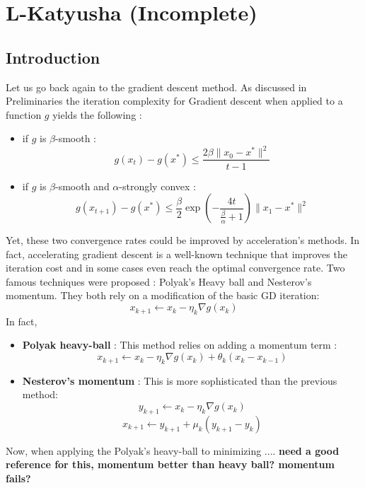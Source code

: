\documentclass[12pt]{report}
\begin{document}
\chapter{L-Katyusha  (Incomplete)}
\section{Introduction}
Let us go back again to the gradient descent method. As discussed in Preliminaries the iteration complexity for Gradient descent when applied to a function $g$ yields the following :
\begin{itemize}
    \item if $g$ is $\beta$-smooth : 
    \begin{equation} \label{eq:smooth}
g(x_t)-g(x^*)\leq \frac{2\beta\| x_0-x^*\|^2}{t-1}
\end{equation}
    \item if $g$ is $\beta$-smooth and $\alpha$-strongly convex :\begin{equation} \label{eq:strg}
g(x_{t+1})-g(x^*)\leq \frac{\beta}{2}\exp(-\frac{4t}{\frac{\beta}{\alpha}+1})\| x_1-x^*\|^2
\end{equation} 
\end{itemize}
Yet, these two convergence rates could be improved by acceleration's methods.
In fact, accelerating gradient descent is a well-known technique that improves the iteration cost and in some cases even reach the optimal convergence rate.
Two famous techniques were proposed : Polyak's Heavy ball and Nesterov's momentum. They both rely on a modification of the basic GD iteration:
\begin{equation}\label{iteration}
    x_{k+1}\gets x_k-\eta_k\nabla g(x_k)
\end{equation}
In fact,
\begin{itemize}
    \item \textbf{Polyak heavy-ball} :
    This method relies on adding a momentum term :
    $$ x_{k+1}\gets x_k-\eta_k\nabla g(x_k)+{\theta_k(x_k-x_{k-1})}$$
    \item \textbf{Nesterov's momentum} : 
    This is more sophisticated than the previous method:
    $$y_{k+1}\gets x_k-\eta_k\nabla g(x_k)$$ $$x_{k+1}\gets y_{k+1}+\mu_k(y_{k+1}-y_k)$$
\end{itemize}

Now, when applying the Polyak's heavy-ball to minimizing .... \textbf{need a good reference for this, momentum better than heavy ball? momentum fails?}
\end{document}
